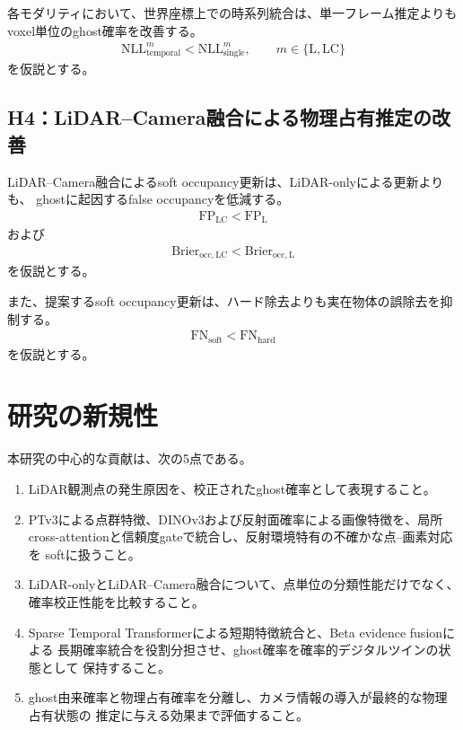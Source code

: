 \documentclass[uplatex,a4paper,11pt]{jsarticle}
\begin{document}
各モダリティにおいて、世界座標上での時系列統合は、単一フレーム推定よりも
voxel単位のghost確率を改善する。
\begin{align}
  \mathrm{NLL}_{\mathrm{temporal}}^{m}
  <
  \mathrm{NLL}_{\mathrm{single}}^{m},
  \qquad
  m\in\{\mathrm{L},\mathrm{LC}\}
\end{align}
を仮説とする。

\subsection{H4：LiDAR--Camera融合による物理占有推定の改善}

LiDAR--Camera融合によるsoft occupancy更新は、LiDAR-onlyによる更新よりも、
ghostに起因するfalse occupancyを低減する。
\begin{align}
  \mathrm{FP}_{\mathrm{LC}}
  <
  \mathrm{FP}_{\mathrm{L}}
\end{align}
および
\begin{align}
  \mathrm{Brier}_{\mathrm{occ,LC}}
  <
  \mathrm{Brier}_{\mathrm{occ,L}}
\end{align}
を仮説とする。

また、提案するsoft occupancy更新は、ハード除去よりも実在物体の誤除去を抑制する。
\begin{align}
  \mathrm{FN}_{\mathrm{soft}}
  <
  \mathrm{FN}_{\mathrm{hard}}
\end{align}
を仮説とする。

\section{研究の新規性}

本研究の中心的な貢献は、次の5点である。
\begin{enumerate}
  \item LiDAR観測点の発生原因を、校正されたghost確率として表現すること。
  \item PTv3による点群特徴、DINOv3および反射面確率による画像特徴を、局所
        cross-attentionと信頼度gateで統合し、反射環境特有の不確かな点--画素対応を
        softに扱うこと。
  \item LiDAR-onlyとLiDAR--Camera融合について、点単位の分類性能だけでなく、
        確率校正性能を比較すること。
  \item Sparse Temporal Transformerによる短期特徴統合と、Beta evidence fusionによる
        長期確率統合を役割分担させ、ghost確率を確率的デジタルツインの状態として
        保持すること。
  \item ghost由来確率と物理占有確率を分離し、カメラ情報の導入が最終的な物理占有状態の
        推定に与える効果まで評価すること。
\end{enumerate}
\end{document}
